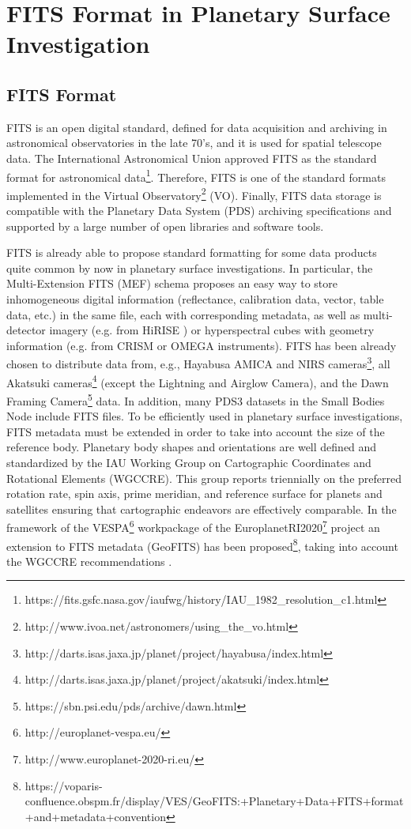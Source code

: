 \section{FITS Format in Planetary Surface Investigation}
\label{sec:fitspss}

\subsection{FITS Format}
FITS is an open digital standard, defined for data acquisition and archiving
in astronomical observatories in the late 70's, and it is used for
spatial telescope data.
The International Astronomical Union approved FITS as the standard format
for astronomical data\footnote{https://fits.gsfc.nasa.gov/iaufwg/history/IAU\_1982\_resolution\_c1.html}. 
Therefore, FITS is one of the standard formats implemented in the Virtual
Observatory\footnote{http://www.ivoa.net/astronomers/using\_the\_vo.html}
(VO).
Finally, FITS data storage is compatible with the Planetary Data System (PDS)
archiving specifications and supported by a large number of open libraries
and software tools.

FITS is already able to propose standard formatting for some data products
quite common by now in planetary surface investigations.
In particular, the Multi-Extension FITS (MEF) schema proposes an easy way
to store inhomogeneous digital information (reflectance, calibration data,
vector, table data, etc.) in the same file, each with corresponding metadata,
as well as multi-detector imagery (e.g. from HiRISE \citep{hirise})
or hyperspectral cubes with geometry information (e.g. from CRISM
\citep{crism} or OMEGA \citep{omega} instruments).
FITS has been already chosen to distribute data from, e.g.,
Hayabusa AMICA and NIRS cameras\footnote{http://darts.isas.jaxa.jp/planet/project/hayabusa/index.html},
all Akatsuki cameras\footnote{http://darts.isas.jaxa.jp/planet/project/akatsuki/index.html}
(except the Lightning and Airglow Camera),
and the Dawn Framing Camera\footnote{https://sbn.psi.edu/pds/archive/dawn.html} data.
In addition, many PDS3 datasets in the Small Bodies Node include FITS files.
To be efficiently used in planetary surface investigations, FITS metadata must
be extended in order to take into account the size of the reference body.
Planetary body shapes and orientations are well defined and standardized by
the IAU Working Group on Cartographic Coordinates and Rotational Elements
(WGCCRE).
This group reports triennially \citep{wgccre} on the preferred rotation rate,
spin axis, prime meridian, and reference surface for planets and satellites
ensuring that cartographic endeavors are effectively comparable.
In the framework of the VESPA\footnote{http://europlanet-vespa.eu/}
\citep{vespapss} workpackage of the EuroplanetRI2020\footnote{http://www.europlanet-2020-ri.eu/}
project an extension to FITS metadata (GeoFITS) has been
proposed\footnote{https://voparis-confluence.obspm.fr/display/VES/GeoFITS:+Planetary+Data+FITS+format+and+metadata+convention},
taking into account the WGCCRE recommendations \citep{MarmoLPSC}.

